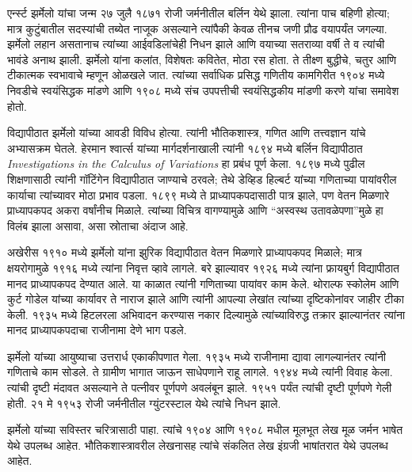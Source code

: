 \documentclass[../../../include/open-logic-section]{subfiles}
\begin{document}



एर्न्स्ट झर्मेलो यांचा जन्म २७ जुलै १८७१ रोजी जर्मनीतील बर्लिन येथे झाला. त्यांना पाच बहिणी होत्या; मात्र कुटुंबातील सदस्यांची तब्येत नाजूक असल्याने त्यांपैकी केवळ तीनच जणी प्रौढ वयापर्यंत जगल्या. झर्मेलो लहान असतानाच त्यांच्या आईवडिलांचेही निधन झाले आणि वयाच्या सतराव्या वर्षी ते व त्यांची भावंडे अनाथ झाली. झर्मेलो यांना कलांत, विशेषतः कवितेत, मोठा रस होता. ते तीक्ष्ण बुद्धीचे, चतुर आणि टीकात्मक स्वभावाचे म्हणून ओळखले जात. त्यांच्या सर्वाधिक प्रसिद्ध गणितीय कामगिरीत १९०४ मध्ये निवडीचे स्वयंसिद्धक मांडणे आणि १९०८ मध्ये संच उपपत्तीची स्वयंसिद्धकीय मांडणी करणे यांचा समावेश होतो.

विद्यापीठात झर्मेलो यांच्या आवडी विविध होत्या. त्यांनी भौतिकशास्त्र, गणित आणि तत्त्वज्ञान यांचे अभ्यासक्रम घेतले. हेरमान श्वार्त्स यांच्या मार्गदर्शनाखाली त्यांनी १८९४ मध्ये बर्लिन विद्यापीठात \emph{Investigations in
  the Calculus of Variations} हा प्रबंध पूर्ण केला. १८९७ मध्ये पुढील शिक्षणासाठी त्यांनी गॉटिंगेन विद्यापीठात जाण्याचे ठरवले; तेथे डेव्हिड हिल्बर्ट यांच्या गणिताच्या पायांवरील कार्याचा त्यांच्यावर मोठा प्रभाव पडला. १८९९ मध्ये ते प्राध्यापकपदासाठी पात्र झाले, पण वेतन मिळणारे प्राध्यापकपद अकरा वर्षांनीच मिळाले. त्यांच्या विचित्र वागण्यामुळे आणि “अस्वस्थ उतावळेपणा”मुळे हा विलंब झाला असावा, असा स्रोताचा अंदाज आहे.

अखेरीस १९१० मध्ये झर्मेलो यांना झुरिक विद्यापीठात वेतन मिळणारे प्राध्यापकपद मिळाले; मात्र क्षयरोगामुळे १९१६ मध्ये त्यांना निवृत्त व्हावे लागले. बरे झाल्यावर १९२६ मध्ये त्यांना फ्रायबुर्ग विद्यापीठात मानद प्राध्यापकपद देण्यात आले. या काळात त्यांनी गणिताच्या पायांवर काम केले. थोराल्फ स्कोलेम आणि कुर्ट गोडेल यांच्या कार्यावर ते नाराज झाले आणि त्यांनी आपल्या लेखांत त्यांच्या दृष्टिकोनांवर जाहीर टीका केली. १९३५ मध्ये हिटलरला अभिवादन करण्यास नकार दिल्यामुळे त्यांच्याविरुद्ध तक्रार झाल्यानंतर त्यांना मानद प्राध्यापकपदाचा राजीनामा देणे भाग पडले.

झर्मेलो यांच्या आयुष्याचा उत्तरार्ध एकाकीपणात गेला. १९३५ मध्ये राजीनामा द्यावा लागल्यानंतर त्यांनी गणिताचे काम सोडले. ते ग्रामीण भागात जाऊन साधेपणाने राहू लागले. १९४४ मध्ये त्यांनी विवाह केला. त्यांची दृष्टी मंदावत असल्याने ते पत्नीवर पूर्णपणे अवलंबून झाले. १९५१ पर्यंत त्यांची दृष्टी पूर्णपणे गेली होती. २१ मे १९५३ रोजी जर्मनीतील ग्युंटरस्टाल येथे त्यांचे निधन झाले.

\begin{reading}
झर्मेलो यांच्या सविस्तर चरित्रासाठी \citet{Ebbinghaus2015} पाहा. त्यांचे १९०४ आणि १९०८ मधील मूलभूत लेख मूळ जर्मन भाषेत \citep{Zermelo1904,Zermelo1908} येथे उपलब्ध आहेत. भौतिकशास्त्रावरील लेखनासह त्यांचे संकलित लेख इंग्रजी भाषांतरात \citep{Ebbinghaus2010,Ebbinghaus2013} येथे उपलब्ध आहेत.
\end{reading}
\end{document}
